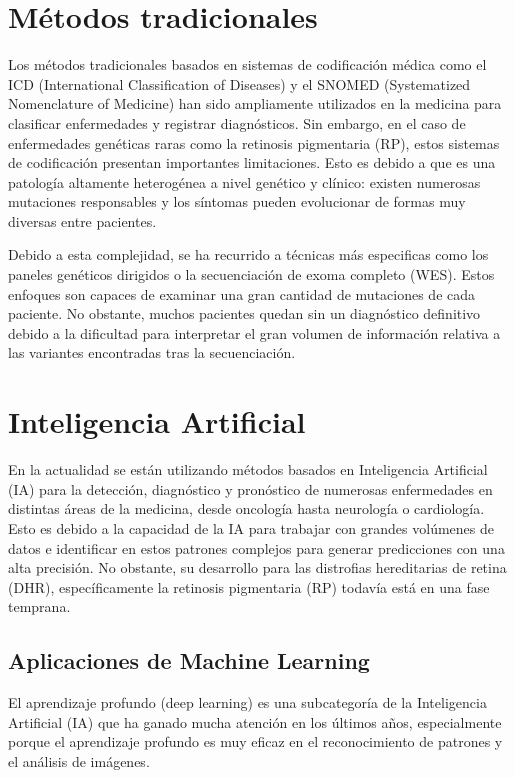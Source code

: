 \documentclass[11pt,spanish,listoffigures,listoftables]{tfgetsinf}
\begin{document}
\section{Métodos tradicionales}

Los métodos tradicionales basados en sistemas de codificación médica como el ICD (International Classification of Diseases) y el SNOMED (Systematized Nomenclature of Medicine) han sido ampliamente utilizados en la medicina para clasificar enfermedades y registrar diagnósticos. Sin embargo, en el caso de enfermedades genéticas raras como la retinosis pigmentaria (\acs{RP}), estos sistemas de codificación presentan importantes limitaciones\cite{VER}. Esto es debido a que es una patología altamente heterogénea a nivel genético y clínico: existen numerosas mutaciones responsables y los síntomas pueden evolucionar de formas muy diversas entre pacientes\cite{HAR}. 

Debido a esta complejidad, se ha recurrido a técnicas más especificas como los paneles genéticos dirigidos o la secuenciación de exoma completo (\acs{WES}). Estos enfoques son capaces de examinar una gran cantidad de mutaciones de cada paciente. No obstante, muchos pacientes quedan sin un diagnóstico definitivo debido a la dificultad para interpretar el gran volumen de información relativa a las variantes encontradas tras la secuenciación.

\section{Inteligencia Artificial}

En la actualidad se están utilizando métodos basados en Inteligencia Artificial (\acs{IA}) para la detección, diagnóstico y pronóstico de numerosas enfermedades en distintas áreas de la medicina, desde oncología hasta neurología o cardiología. Esto es debido a la capacidad de la \acs{IA} para trabajar con grandes volúmenes de datos e identificar en estos patrones complejos para generar predicciones con una alta precisión\cite{FER}. No obstante, su desarrollo para las distrofias hereditarias de retina (\acs{DHR}), específicamente la retinosis pigmentaria (\acs{RP}) todavía está en una fase temprana.

\subsection{Aplicaciones de Machine Learning}

El aprendizaje profundo (deep learning) es una subcategoría de la Inteligencia Artificial (\acs{IA}) que ha ganado mucha atención en los últimos años, especialmente porque el aprendizaje profundo es muy eficaz en el reconocimiento de patrones y el análisis de imágenes\cite{STE}.
\end{document}
